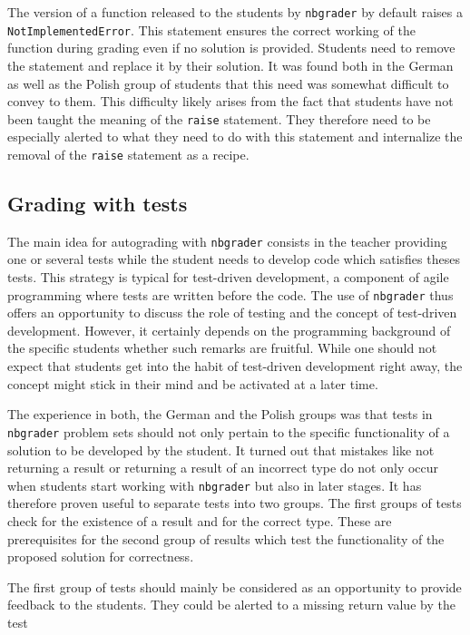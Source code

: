 \documentclass[twocolumn]{svjour3}          %
\begin{document}
The version of a function released to the students by \texttt{nbgrader} by
default raises a \texttt{NotImplementedError}. This statement ensures the
correct working of the function during grading even if no solution is provided.
Students need to remove the statement and replace it by their solution. It was
found both in the German as well as the Polish group of students that this need
was somewhat difficult to convey to them. This difficulty likely arises from
the fact that students have not been taught the meaning of the \texttt{raise}
statement. They therefore need to be especially alerted to what they need to do
with this statement and internalize the removal of the \texttt{raise} statement
as a recipe.

\subsection{Grading with tests}

The main idea for autograding with \texttt{nbgrader} consists in the teacher
providing one or several tests while the student needs to develop code which
satisfies theses tests. This strategy is typical for test-driven development,
a component of agile programming where tests are written before the code.
The use of \texttt{nbgrader} thus offers an opportunity to discuss the role
of testing and the concept of test-driven development. However, it certainly
depends on the programming background of the specific students whether such
remarks are fruitful. While one should not expect that students get into the
habit of test-driven development right away, the concept might stick in their
mind and be activated at a later time.

The experience in both, the German and the Polish groups was that tests in
\texttt{nbgrader} problem sets should not only pertain to the specific
functionality of a solution to be developed by the student. It turned out
that mistakes like not returning a result or returning a result of an incorrect
type do not only occur when students start working with \texttt{nbgrader} but
also in later stages. It has therefore proven useful to separate tests into
two groups. The first groups of tests check for the existence of a result
and for the correct type. These are prerequisites for the second group of results
which test the functionality of the proposed solution for correctness.

The first group of tests should mainly be considered as an opportunity to
provide feedback to the students. They could be alerted to a missing return
value by the test
\end{document}
